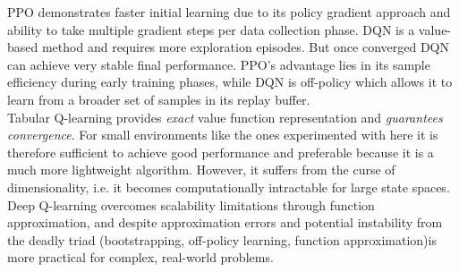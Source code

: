 \documentclass[12pt]{article}
\begin{document}
PPO demonstrates faster initial learning due to its policy gradient approach and ability to take multiple gradient steps per data collection phase.
DQN is a value-based method and requires more exploration episodes. But once converged DQN can achieve very stable final performance.
PPO's advantage lies in its sample efficiency during early training phases, while DQN is off-policy which allows it to learn from a broader set of samples in its replay buffer. \\

Tabular Q-learning provides \textit{exact} value function representation and \textit{guarantees convergence}.
For small environments like the ones experimented with here it is therefore sufficient to achieve good performance and preferable because it is a much more lightweight algorithm.
However, it suffers from the curse of dimensionality, i.e. it becomes computationally intractable for large state spaces.
Deep Q-learning overcomes scalability limitations through function approximation, and despite approximation errors and potential instability from the deadly triad (bootstrapping, off-policy learning, function approximation)is more practical for complex, real-world problems.


\newpage
\nocite{*}
\printbibliography
\end{document}
